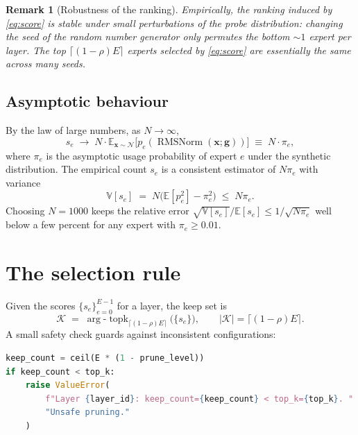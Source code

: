\documentclass[11pt,a4paper]{article}
\newcommand{\E}{\mathbb{E}}
\newcommand{\V}{\mathbb{V}}
\newcommand{\1}{\mathbf{1}}
\newcommand{\x}{\bm{x}}
\newcommand{\Keep}{\mathcal{K}}
\theoremstyle{plain}
\newtheorem{remark}{Remark}
\begin{document}
\begin{remark}[Robustness of the ranking]
Empirically, the ranking induced by \eqref{eq:score} is stable under
small perturbations of the probe distribution: changing the seed of
the random number generator only permutes the bottom $\sim 1$ expert
per layer.  The top $\lceil (1-\rho) E \rceil$ experts selected by
\eqref{eq:score} are essentially the same across many seeds.
\end{remark}

\subsection{Asymptotic behaviour}

By the law of large numbers, as $N \to \infty$,
\begin{equation}
  s_e \;\longrightarrow\; N \cdot \E_{\x \sim \mathcal{N}}\!\bigl[p_e(\operatorname{RMSNorm}(\x; \bm{g}))\bigr]
  \;\equiv\; N \cdot \pi_e,
  \label{eq:asymptotic}
\end{equation}
where $\pi_e$ is the asymptotic usage probability of expert $e$ under
the synthetic distribution.  The empirical count $s_e$ is a
consistent estimator of $N \pi_e$ with variance
\begin{equation}
  \V[s_e] \;=\; N \bigl(\E[p_e^2] - \pi_e^2\bigr)
              \;\le\; N \pi_e.
  \label{eq:variance}
\end{equation}
Choosing $N = 1000$ keeps the relative error
$\sqrt{\V[s_e]}/\E[s_e] \le 1/\sqrt{N \pi_e}$ well below a few
percent for any expert with $\pi_e \ge 0.01$.

\section{The selection rule}

Given the scores $\{s_e\}_{e=0}^{E-1}$ for a layer, the keep set is
\begin{equation}
  \Keep \;=\; \arg\text{-}\!\operatorname{topk}_{\lceil (1-\rho)E \rceil}\!\bigl(\{s_e\}\bigr),
  \qquad |\Keep| = \lceil (1-\rho)E \rceil.
  \label{eq:keep}
\end{equation}
A small safety check guards against inconsistent configurations:

\begin{lstlisting}[language=Python, caption={Per-layer safety check.}]
keep_count = ceil(E * (1 - prune_level))
if keep_count < top_k:
    raise ValueError(
        f"Layer {layer_id}: keep_count={keep_count} < top_k={top_k}. "
        "Unsafe pruning."
    )
\end{lstlisting}
\end{document}
